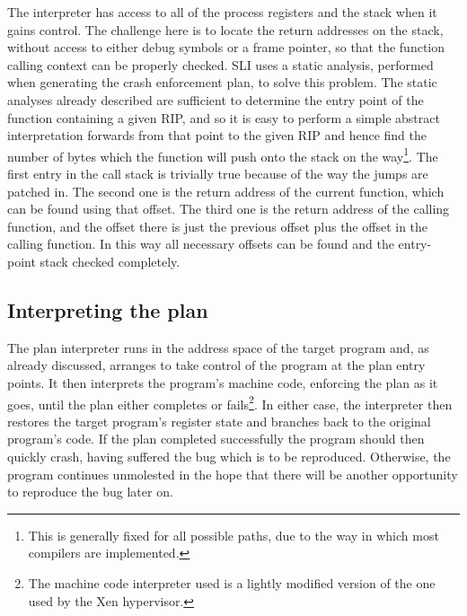 
\label{sect:using:find_return_address}
The interpreter has access to all of the process registers and the
stack when it gains control.  The challenge here is to locate the
return addresses on the stack, without access to either debug symbols
or a frame pointer, so that the function calling context can be
properly checked.  SLI uses a static analysis, performed when
generating the crash enforcement plan, to solve this problem.  The
static analyses already described are sufficient to determine the
entry point of the function containing a given RIP, and so it is easy to perform a simple abstract
interpretation forwards from that point to the given RIP and hence
find the number of bytes which the function will push onto the stack
on the way\footnote{This is generally fixed for all possible paths,
  due to the way in which most compilers are implemented.}.  The first
entry in the call stack is trivially true because of the way the jumps
are patched in.  The second one is the return address of the current
function, which can be found using that offset.  The third one is the
return address of the calling function, and the offset there is just
the previous offset plus the offset in the calling function.  In this
way all necessary offsets can be found and the entry-point stack
checked completely.


\subsection{Interpreting the plan}
\label{sect:enforce:interpreting}


The plan interpreter runs in the address space of the target program
and, as already discussed, arranges to take control of the program at
the plan entry points.  It then interprets the program's machine code,
enforcing the plan as it goes, until the plan either completes or
fails\footnote{The machine code interpreter used is a lightly
  modified version of the one used by the Xen hypervisor\needCite{}.}.
In either case, the interpreter then restores the target program's
register state and branches back to the original program's code.  If
the plan completed successfully the program should then quickly crash,
having suffered the bug which is to be reproduced.  Otherwise, the
program continues unmolested in the hope that there will be another
opportunity to reproduce the bug later on.


